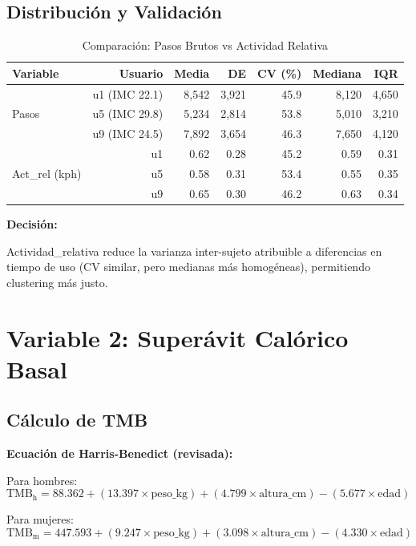 \documentclass[12pt,letterpaper,twoside]{report}
\begin{document}
\subsection{Distribución y Validación}

\begin{table}[H]
\centering
\caption{Comparación: Pasos Brutos vs Actividad Relativa}
\label{tab:activity_comparison}
\begin{tabular}{@{}lrrrrrr@{}}
\toprule
\textbf{Variable} & \textbf{Usuario} & \textbf{Media} & \textbf{DE} & \textbf{CV (\%)} & \textbf{Mediana} & \textbf{IQR} \\
\midrule
\multirow{3}{*}{Pasos} 
    & u1 (IMC 22.1) & 8,542 & 3,921 & 45.9 & 8,120 & 4,650 \\
    & u5 (IMC 29.8) & 5,234 & 2,814 & 53.8 & 5,010 & 3,210 \\
    & u9 (IMC 24.5) & 7,892 & 3,654 & 46.3 & 7,650 & 4,120 \\
\midrule
\multirow{3}{*}{Act\_rel (kph)} 
    & u1 & 0.62 & 0.28 & 45.2 & 0.59 & 0.31 \\
    & u5 & 0.58 & 0.31 & 53.4 & 0.55 & 0.35 \\
    & u9 & 0.65 & 0.30 & 46.2 & 0.63 & 0.34 \\
\bottomrule
\end{tabular}
\end{table}

\begin{decisionbox}
\textbf{Decisión:}

Actividad\_relativa reduce la varianza inter-sujeto atribuible a diferencias en tiempo de uso (CV similar, pero medianas más homogéneas), permitiendo clustering más justo.
\end{decisionbox}

\section{Variable 2: Superávit Calórico Basal}

\subsection{Cálculo de TMB}

\begin{estadisticobox}
\textbf{Ecuación de Harris-Benedict (revisada):}

Para hombres:
\begin{equation}
\text{TMB}_{\text{h}} = 88.362 + (13.397 \times \text{peso\_kg}) + (4.799 \times \text{altura\_cm}) - (5.677 \times \text{edad})
\end{equation}

Para mujeres:
\begin{equation}
\text{TMB}_{\text{m}} = 447.593 + (9.247 \times \text{peso\_kg}) + (3.098 \times \text{altura\_cm}) - (4.330 \times \text{edad})
\end{equation}
\end{estadisticobox}
\end{document}
